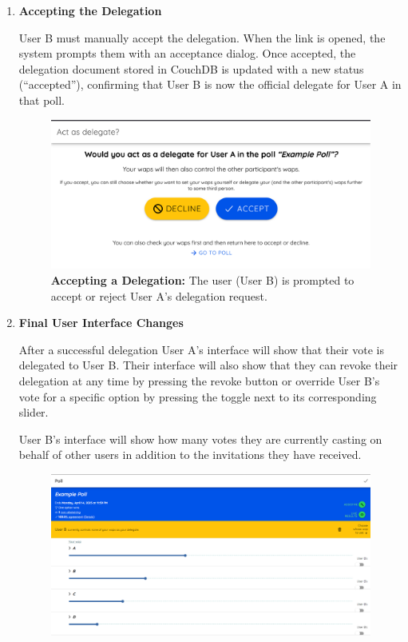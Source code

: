 \begin{enumerate}
\item \textbf{Accepting the Delegation}

User B must manually accept the delegation. When the link is opened, the system prompts them with an acceptance dialog. Once accepted, the delegation document stored in CouchDB is updated with a new status (``accepted''), confirming that User B is now the official delegate for User A in that poll.

\begin{figure}[H]
    \centering
    \includegraphics[width=0.8\linewidth]{../common/initial_vodle_screenshots/delaccept.png}
    \caption{\textbf{Accepting a Delegation:} The user (User B) is prompted to accept or reject User A's delegation request.}
    \label{fig:delaccept_initial}
\end{figure}

\item \textbf{Final User Interface Changes}

After a successful delegation User A's interface will show that their vote is delegated to User B. Their interface will also show that they can revoke their delegation at any time by pressing the revoke button or override User B's vote for a specific option by pressing the toggle next to its corresponding slider.

User B's interface will show how many votes they are currently casting on behalf of other users in addition to the invitations they have received.
\begin{figure} [H]
    \centering
    \includegraphics[width=0.8\linewidth]{../common/initial_vodle_screenshots/userA_after.png}


\end{figure}
\end{enumerate}
